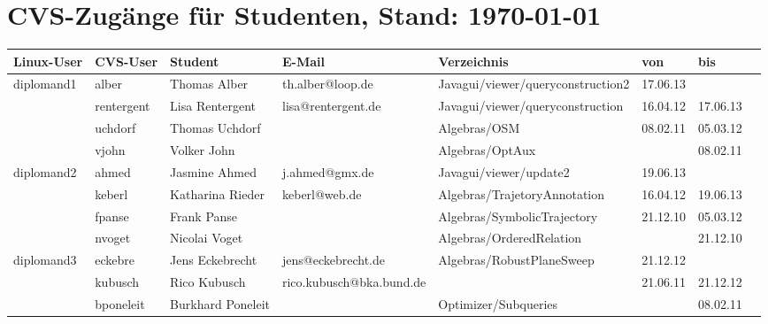 \documentclass[a4paper,9pt,landscape]{scrartcl}
\begin{document}
\section{CVS-Zug\"ange f\"ur Studenten, Stand: \today}
\begin{longtabu}to 1\textwidth{|l|l|l|l|l|X|l|l|}
  \hline \hline
\textbf{Linux-User}        &\textbf{CVS-User}        &\textbf{Student}&\textbf{E-Mail}       &\textbf{Verzeichnis}              &\textbf{von} &\textbf{bis}\\
\hline
\hline\endhead
{}diplomand1   &alber  &Thomas Alber    &th.alber@loop.de      &Javagui/viewer/queryconstruction2 &17.06.13     &\\
            &rentergent               &Lisa Rentergent &lisa@rentergent.de    &Javagui/viewer/queryconstruction  &16.04.12     &17.06.13\\
            &uchdorf                  &Thomas Uchdorf  &                      &Algebras/OSM                      &08.02.11     &05.03.12\\
            &vjohn                    &Volker John     &                      &Algebras/OptAux                   &             &08.02.11\\
\hline
\hline
{}diplomand2   &ahmed  &Jasmine Ahmed   &j.ahmed@gmx.de        &Javagui/viewer/update2            &19.06.13     &\\
            &keberl                   &Katharina Rieder&keberl@web.de         &Algebras/TrajetoryAnnotation      &16.04.12     &19.06.13\\
            &fpanse                   &Frank Panse     &                      &Algebras/SymbolicTrajectory       &21.12.10     &05.03.12\\
            &nvoget                   &Nicolai Voget   &                      &Algebras/OrderedRelation          &             &21.12.10\\
\hline
\hline
{}diplomand3   &eckebre&Jens Eckebrecht &jens@eckebrecht.de    &Algebras/RobustPlaneSweep         &21.12.12     & \\
            &kubusch                  &Rico Kubusch    &rico.kubusch@bka.bund.de&                                &21.06.11     &21.12.12\\
            &bponeleit                &Burkhard Poneleit&                     &Optimizer/Subqueries              &             &08.02.11\\

\end{longtabu}
\end{document}
